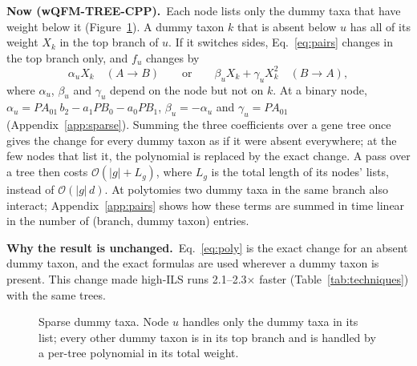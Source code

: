 \documentclass[11pt,a4paper]{article}
\newcommand{\cpp}{wQFM-TREE-CPP}
\newcommand{\Oh}{\mathcal{O}}
\newcommand{\Now}{\par\smallskip\noindent\textbf{\textcolor{nowc}{Now (\cpp).}}\ }
\newcommand{\Exact}{\par\smallskip\noindent\textbf{Why the result is unchanged.}\ }
\begin{document}
\Now Each node lists only the dummy taxa that have weight below it (Figure~\ref{fig:sparse}). A dummy
taxon $k$ that is absent below $u$ has all of its weight $X_k$ in the top branch of $u$. If it
switches sides, Eq.~\eqref{eq:pairs} changes in the top branch only, and $f_u$ changes by
\begin{equation}\label{eq:poly}
  \alpha_u X_k \quad (A\to B) \qquad\text{or}\qquad \beta_u X_k + \gamma_u X_k^2 \quad (B\to A),
\end{equation}
where $\alpha_u$, $\beta_u$ and $\gamma_u$ depend on the node but not on $k$. At a binary node,
$\alpha_u = PA_{01}\,b_2 - a_1PB_0 - a_0PB_1$, $\beta_u=-\alpha_u$ and $\gamma_u=PA_{01}$
(Appendix~\ref{app:sparse}). Summing the three coefficients over a gene tree once gives the change
for every dummy taxon as if it were absent everywhere; at the few nodes that list it, the polynomial
is replaced by the exact change. A pass over a tree then costs $\Oh(|g| + L_g)$, where $L_g$ is the
total length of its nodes' lists, instead of $\Oh(|g|\,d)$. At polytomies two dummy taxa in the same
branch also interact; Appendix~\ref{app:pairs} shows how these terms are summed in time linear in
the number of (branch, dummy taxon) entries.

\Exact Eq.~\eqref{eq:poly} is the exact change for an absent dummy taxon, and the exact formulas
are used wherever a dummy taxon is present. This change made high-ILS runs 2.1--2.3$\times$ faster
(Table~\ref{tab:techniques}) with the same trees.

\begin{figure}[t]
\centering
{}
\caption{Sparse dummy taxa. Node $u$ handles only the dummy taxa in its list; every other dummy taxon
is in its top branch and is handled by a per-tree polynomial in its total weight.}
\label{fig:sparse}
\end{figure}
\end{document}
